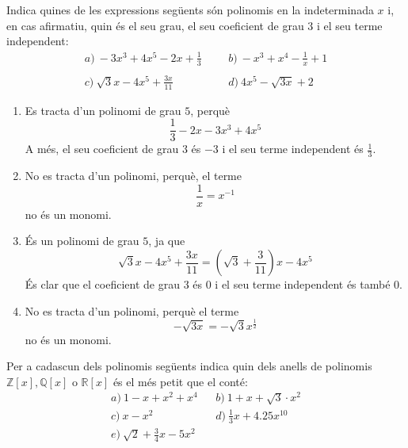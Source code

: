 \begin{exercici}
Indica quines de les expressions següents són polinomis en la
indeterminada $x$ i, en cas afirmatiu, quin és el seu grau, el seu
coeficient de grau $3$ i el seu terme independent:\[
\begin{array}{llll}
a)~-3x^{3}+4x^{5}-2x+\frac{1}{3} & & & b)~-x^{3}+x^{4}-\frac{1}{x}+1 \\
& & & \\
c)~\sqrt{3}x-4x^{5}+\frac{3x}{11} & & & d)~4x^{5}-\sqrt{3x}+2~\end{array}\]
\end{exercici}

\begin{solucio}

\begin{enumerate}
\item[a)] Es tracta d'un polinomi de grau $5$, perquè\[
\frac{1}{3}-2x-3x^{3}+4x^{5}
\]A més, el seu coeficient de grau $3$ és $-3$ i el seu terme
independent és $\frac{1}{3}$.

\item[b)] No es tracta d'un polinomi, perquè, el terme
\[
\frac{1}{x}=x^{-1}
\]no és un monomi.

\item[c)] És un polinomi de grau $5$, ja que\[
\sqrt{3}x-4x^{5}+\frac{3x}{11}=\left( \sqrt{3}+\frac{3}{11}\right) x-4x^{5}
\]És clar que el coeficient de grau $3$ és $0$ i el seu terme
independent és també $0$.

\item[d)] No es tracta d'un polinomi, perquè el terme
\[
-\sqrt{3x}=-\sqrt{3}x^{\frac{1}{2}}
\]no és un monomi.
\end{enumerate}
\end{solucio}

\begin{exercici}
Per a cadascun dels polinomis següents indica quin dels anells de
polinomis $\mathbb{Z}[x],\mathbb{Q}[x]$ o $\mathbb{R}[x]$ és el més
petit que el conté:\[
\begin{array}{lll}
a)~1-x+x^{2}+x^{4} & & b)~1+x+\sqrt{3}\cdot x^{2} \\
c)~x-x^{2} & & d)~\frac{1}{3}x+4.25x^{10} \\
e)~\sqrt{2}+\frac{3}{4}x-5x^{2} & &
\end{array}\]
\end{exercici}

